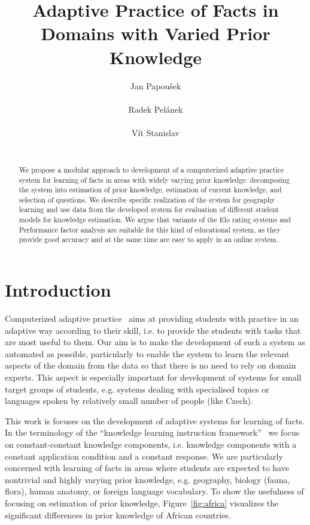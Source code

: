 \documentclass{edm_template}
\title{Adaptive Practice of Facts in Domains with Varied Prior Knowledge}
\author{
\alignauthor Jan Papou\v{s}ek\\
       \affaddr{Masaryk University Brno}\\
       \email{jan.papousek@mail.muni.cz}
\alignauthor Radek Pel\'{a}nek\\
       \affaddr{Masaryk University Brno}\\
       \email{pelanek@fi.muni.cz}
\alignauthor V\'{i}t Stanislav\\
       \affaddr{Masaryk University Brno}\\
       \email{slaweet@mail.muni.cz}
}
\begin{document}
\maketitle

\begin{abstract}
  We propose a modular approach to development of a computerized adaptive
  practice system for learning of facts in areas with widely varying prior
  knowledge: decomposing the system into estimation of prior knowledge,
  estimation of current knowledge, and selection of questions. We describe
  specific realization of the system for geography learning and use data from
  the developed system for evaluation of different student models for knowledge
  estimation. We argue that variants of the Elo rating systems and Performance
  factor analysis are suitable for this kind of educational system, as they
  provide good accuracy and at the same time are easy to apply in an online
  system.
\end{abstract}


\section{Introduction}

Computerized adaptive practice~\cite{klinkenberg2011computer} aims at providing
students with practice in an adaptive way according to their skill, i.e. to
provide the students with tasks that are most useful to them. Our aim is to
make the development of such a system as automated as possible, particularly to
enable the system to learn the relevant aspects of the domain from the data so
that there is no need to rely on domain experts. This aspect is especially
important for development of systems for small target groups of students, e.g.
systems dealing with specialised topics or languages spoken by relatively small
number of people (like Czech).

This work is focuses on the development of adaptive systems for learning of
facts. In the terminology of the ``knowledge learning instruction
framework''~\cite{koedinger2012knowledge} we focus on constant-constant
knowledge components, i.e. knowledge components with a constant application
condition and a constant response. We are particularly concerned with learning of facts in
areas where students are expected to have nontrivial and highly varying prior
knowledge, e.g. geography, biology (fauna, flora), human anatomy, or foreign
language vocabulary. To show the usefulness of focusing on estimation of
prior knowledge, Figure~\ref{fig:africa} visualizes the significant differences
in prior knowledge of African countries.
\end{document}
